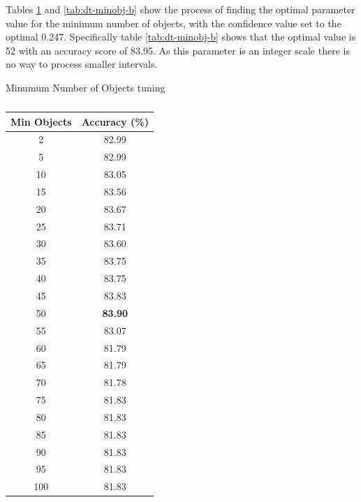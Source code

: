 \documentclass[12pt]{article}
\begin{document}
      Tables \ref{tab:dt-minobj-a} and \ref{tab:dt-minobj-b} show the process of finding the optimal parameter value for the minimum number of objects, with the confidence value set to the optimal 0.247. Specifically table \ref{tab:dt-minobj-b} shows that the optimal value is 52 with an accuracy score of 83.95. As this parameter is an integer scale there is no way to process smaller intervals.

      \begin{table}[H]
        \caption{Minumum Number of Objects tuning}
        \begin{subtable}{.5\linewidth}
          \centering
          \caption{}
          \begin{tabular}{c|c}
          \toprule
          \multicolumn{1}{l|}{Min Objects} & \multicolumn{1}{l}{Accuracy (\%)} \\
          \midrule
          2     & 82.99 \\
          5     & 82.99 \\
          10    & 83.05 \\
          15    & 83.56 \\
          20    & 83.67 \\
          25    & 83.71 \\
          30    & 83.60 \\
          35    & 83.75 \\
          40    & 83.75 \\
          45    & 83.83 \\
          50    & \textbf{83.90} \\
          55    & 83.07 \\
          60    & 81.79 \\
          65    & 81.79 \\
          70    & 81.78 \\
          75    & 81.83 \\
          80    & 81.83 \\
          85    & 81.83 \\
          90    & 81.83 \\
          95    & 81.83 \\
          100   & 81.83 \\
          \bottomrule
          \end{tabular}
          \label{tab:dt-minobj-a}
        \end{subtable}
        \begin{subtable}{.5\linewidth}
          \centering

\end{subtable}
\end{table}
\end{document}
